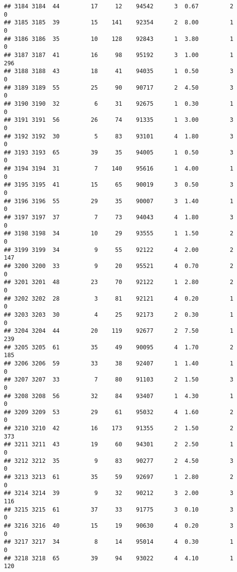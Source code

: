 \documentclass[
]{article}
\begin{document}
\begin{verbatim}
## 3184 3184  44         17     12    94542      3  0.67         2        0
## 3185 3185  39         15    141    92354      2  8.00         1        0
## 3186 3186  35         10    128    92843      1  3.80         1        0
## 3187 3187  41         16     98    95192      3  1.00         1      296
## 3188 3188  43         18     41    94035      1  0.50         3        0
## 3189 3189  55         25     90    90717      2  4.50         3        0
## 3190 3190  32          6     31    92675      1  0.30         1        0
## 3191 3191  56         26     74    91335      1  3.00         3        0
## 3192 3192  30          5     83    93101      4  1.80         3        0
## 3193 3193  65         39     35    94005      1  0.50         3        0
## 3194 3194  31          7    140    95616      1  4.00         1        0
## 3195 3195  41         15     65    90019      3  0.50         3        0
## 3196 3196  55         29     35    90007      3  1.40         1        0
## 3197 3197  37          7     73    94043      4  1.80         3        0
## 3198 3198  34         10     29    93555      1  1.50         2        0
## 3199 3199  34          9     55    92122      4  2.00         2      147
## 3200 3200  33          9     20    95521      4  0.70         2        0
## 3201 3201  48         23     70    92122      1  2.80         2        0
## 3202 3202  28          3     81    92121      4  0.20         1        0
## 3203 3203  30          4     25    92173      2  0.30         1        0
## 3204 3204  44         20    119    92677      2  7.50         1      239
## 3205 3205  61         35     49    90095      4  1.70         2      185
## 3206 3206  59         33     38    92407      1  1.40         1        0
## 3207 3207  33          7     80    91103      2  1.50         3        0
## 3208 3208  56         32     84    93407      1  4.30         1        0
## 3209 3209  53         29     61    95032      4  1.60         2        0
## 3210 3210  42         16    173    91355      2  1.50         2      373
## 3211 3211  43         19     60    94301      2  2.50         1        0
## 3212 3212  35          9     83    90277      2  4.50         3        0
## 3213 3213  61         35     59    92697      1  2.80         2        0
## 3214 3214  39          9     32    90212      3  2.00         3      116
## 3215 3215  61         37     33    91775      3  0.10         3        0
## 3216 3216  40         15     19    90630      4  0.20         3        0
## 3217 3217  34          8     14    95014      4  0.30         1        0
## 3218 3218  65         39     94    93022      4  4.10         1      120

\end{verbatim}
\end{document}
